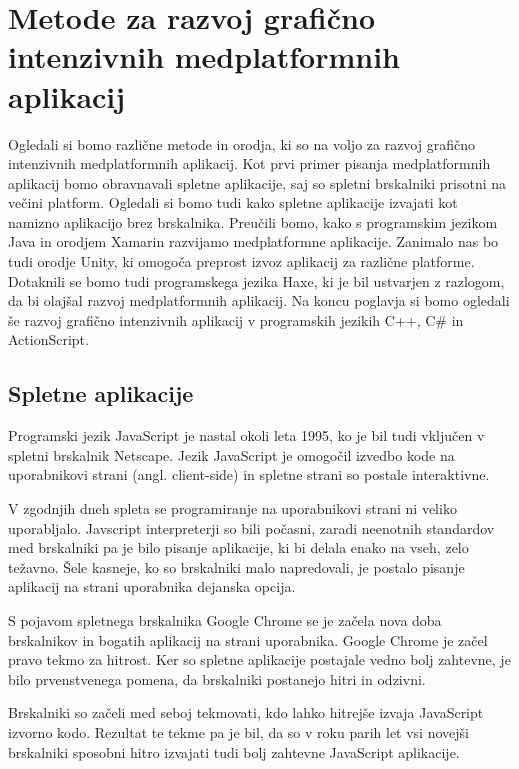 \chapter{Metode za razvoj grafično intenzivnih medplatformnih aplikacij}

Ogledali si bomo različne metode in orodja, ki so na voljo za razvoj grafično intenzivnih medplatformnih aplikacij. Kot prvi primer pisanja medplatformnih aplikacij bomo obravnavali spletne aplikacije, saj so spletni brskalniki prisotni na večini platform. Ogledali si bomo tudi kako spletne aplikacije izvajati kot namizno aplikacijo brez brskalnika. Preučili bomo, kako s programskim jezikom Java in orodjem Xamarin razvijamo medplatformne aplikacije. Zanimalo nas bo tudi orodje Unity, ki omogoča preprost izvoz aplikacij za različne platforme. Dotaknili se bomo tudi programskega jezika Haxe, ki je bil ustvarjen z razlogom, da bi olajšal razvoj medplatformnih aplikacij. Na koncu poglavja si bomo ogledali še razvoj grafično intenzivnih aplikacij v programskih jezikih C++, C\# in ActionScript.

\section{Spletne aplikacije}

Programski jezik JavaScript je nastal okoli leta 1995, ko je bil tudi vključen v spletni brskalnik Netscape. Jezik JavaScript je omogočil izvedbo kode na uporabnikovi strani (angl. client-side) in spletne strani so postale interaktivne.

V zgodnjih dneh spleta se programiranje na uporabnikovi strani ni veliko uporabljalo. Javscript interpreterji so bili počasni, zaradi neenotnih standardov med brskalniki pa je bilo pisanje aplikacije, ki bi delala enako na vseh, zelo težavno. Šele kasneje, ko so brskalniki malo napredovali, je postalo pisanje aplikacij na strani uporabnika dejanska opcija.

S pojavom spletnega brskalnika Google Chrome se je začela nova doba brskalnikov in bogatih aplikacij na strani uporabnika. Google Chrome je začel pravo tekmo za hitrost. Ker so spletne aplikacije postajale vedno bolj zahtevne, je bilo prvenstvenega pomena, da brskalniki postanejo hitri in odzivni.

Brskalniki so začeli med seboj tekmovati, kdo lahko hitrejše izvaja JavaScript izvorno kodo. Rezultat te tekme pa je bil, da so v roku parih let vsi novejši brskalniki sposobni hitro izvajati tudi bolj zahtevne JavaScript aplikacije. 

